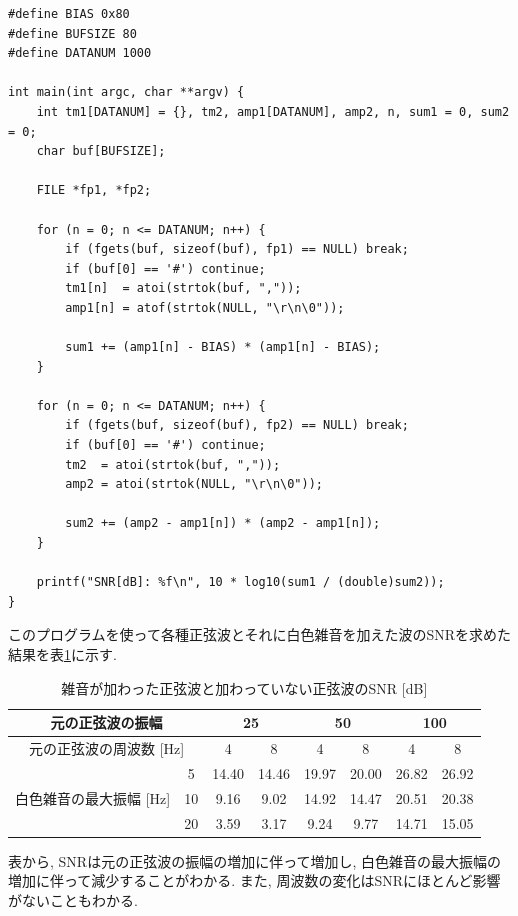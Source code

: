 \documentclass[titlepage]{jsarticle}
\begin{document}
        \begin{lstlisting}[caption=snr.c, label=src:snr]
#define BIAS 0x80
#define BUFSIZE 80
#define DATANUM 1000

int main(int argc, char **argv) {
    int tm1[DATANUM] = {}, tm2, amp1[DATANUM], amp2, n, sum1 = 0, sum2 = 0;
    char buf[BUFSIZE];

    FILE *fp1, *fp2;

    for (n = 0; n <= DATANUM; n++) {
        if (fgets(buf, sizeof(buf), fp1) == NULL) break;
        if (buf[0] == '#') continue;
        tm1[n]  = atoi(strtok(buf, ","));
        amp1[n] = atof(strtok(NULL, "\r\n\0"));

        sum1 += (amp1[n] - BIAS) * (amp1[n] - BIAS);
    }

    for (n = 0; n <= DATANUM; n++) {
        if (fgets(buf, sizeof(buf), fp2) == NULL) break;
        if (buf[0] == '#') continue;
        tm2  = atoi(strtok(buf, ","));
        amp2 = atoi(strtok(NULL, "\r\n\0"));

        sum2 += (amp2 - amp1[n]) * (amp2 - amp1[n]);
    }

    printf("SNR[dB]: %f\n", 10 * log10(sum1 / (double)sum2));
}\end{lstlisting}

        このプログラムを使って各種正弦波とそれに白色雑音を加えた波のSNRを求めた結果を表\ref{tab:snr1}に示す.

        \begin{table}[h]
            \centering
            \caption{雑音が加わった正弦波と加わっていない正弦波のSNR [dB]}
            \label{tab:snr1}
            \begin{tabular}{c|c||cc|cc|cc} \hline
                \multicolumn{2}{c||}{元の正弦波の振幅} & \multicolumn{2}{c|}{25} & \multicolumn{2}{c|}{50} & \multicolumn{2}{c}{100} \\ \hline
                \multicolumn{2}{c||}{元の正弦波の周波数 [Hz]} & 4 & 8 & 4 & 8 & 4 & 8 \\ \hline \hline
                & 5 & 14.40 & 14.46 & 19.97 & 20.00 & 26.82 & 26.92 \\
                白色雑音の最大振幅 [Hz] & 10 & 9.16 & 9.02 & 14.92 & 14.47 & 20.51 & 20.38 \\
                & 20 & 3.59 & 3.17 & 9.24 & 9.77 & 14.71 & 15.05 \\ \hline
            \end{tabular}
        \end{table}

        表から, SNRは元の正弦波の振幅の増加に伴って増加し,
        白色雑音の最大振幅の増加に伴って減少することがわかる.
        また, 周波数の変化はSNRにほとんど影響がないこともわかる.
\end{document}
